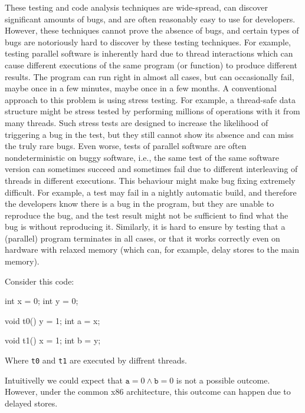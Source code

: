 These testing and code analysis techniques are wide-spread, can discover significant amounts of bugs, and are often reasonably easy to use for developers.
However, these techniques cannot prove the absence of bugs, and certain types of bugs are notoriously hard to discover by these testing techniques.
For example, testing parallel software is inherently hard due to thread interactions which can cause different executions of the same program (or function) to produce different results.
The program can run right in almost all cases, but can occasionally fail, maybe once in a few minutes, maybe once in a few months.
A conventional approach to this problem is using stress testing.
For example, a thread-safe data structure might be stress tested by performing millions of operations with it from many threads.
Such stress tests are designed to increase the likelihood of triggering a bug in the test, but they still cannot show its absence and can miss the truly rare bugs.
Even worse, tests of parallel software are often nondeterministic on buggy software, i.e., the same test of the same software version can sometimes succeed and sometimes fail due to different interleaving of threads in different executions.
This behaviour might make bug fixing extremely difficult.
For example, a test may fail in a nightly automatic build, and therefore the developers know there is a bug in the program, but they are unable to reproduce the bug, and the test result might not be sufficient to find what the bug is without reproducing it.
Similarly, it is hard to ensure by testing that a (parallel) program terminates in all cases, or that it works correctly even on hardware with relaxed memory (which can, for example, delay stores to the main memory).\begin{marginnote}%
Consider this code:

\medskip
\begin{cppcode}
int x = 0;
int y = 0;

void t0() {
  y = 1;
  int a = x;
}

void t1() {
  x = 1;
  int b = y;
}
\end{cppcode}

Where \texttt{t0} and \texttt{t1} are executed by diffrent threads.

Intuitivelly we could expect that $\texttt{a} = 0 \land \texttt{b} = 0$ is not a possible outcome.
However, under the common x86 architecture, this outcome can happen due to delayed stores.
\end{marginnote}

